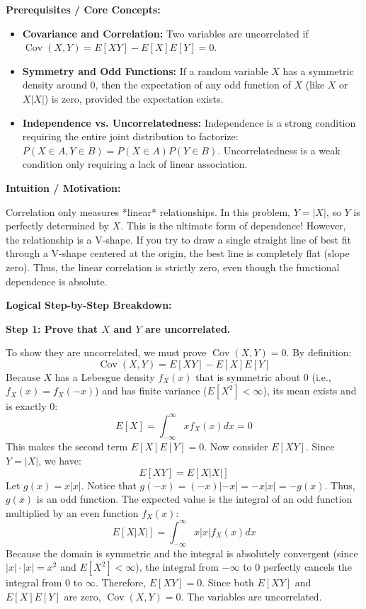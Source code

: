 \begin{solution}
\textbf{Prerequisites / Core Concepts:}
\begin{itemize}
    \item \textbf{Covariance and Correlation:} Two variables are uncorrelated if $\operatorname{Cov}(X,Y) = E[XY] - E[X]E[Y] = 0$.
    \item \textbf{Symmetry and Odd Functions:} If a random variable $X$ has a symmetric density around 0, then the expectation of any odd function of $X$ (like $X$ or $X|X|$) is zero, provided the expectation exists.
    \item \textbf{Independence vs. Uncorrelatedness:} Independence is a strong condition requiring the entire joint distribution to factorize: $P(X \in A, Y \in B) = P(X \in A)P(Y \in B)$. Uncorrelatedness is a weak condition only requiring a lack of linear association.
\end{itemize}

\textbf{Intuition / Motivation:}

Correlation only measures *linear* relationships. In this problem, $Y = |X|$, so $Y$ is perfectly determined by $X$. This is the ultimate form of dependence! However, the relationship is a V-shape. If you try to draw a single straight line of best fit through a V-shape centered at the origin, the best line is completely flat (slope zero). Thus, the linear correlation is strictly zero, even though the functional dependence is absolute.

\textbf{Logical Step-by-Step Breakdown:}

\textbf{Step 1: Prove that $X$ and $Y$ are uncorrelated.}

To show they are uncorrelated, we must prove $\operatorname{Cov}(X, Y) = 0$.
By definition:
\[ \operatorname{Cov}(X, Y) = E[XY] - E[X]E[Y] \]
Because $X$ has a Lebesgue density $f_X(x)$ that is symmetric about 0 (i.e., $f_X(x) = f_X(-x)$) and has finite variance ($E[X^2] < \infty$), its mean exists and is exactly 0:
\[ E[X] = \int_{-\infty}^\infty x f_X(x) dx = 0 \]
This makes the second term $E[X]E[Y] = 0$.
Now consider $E[XY]$. Since $Y = |X|$, we have:
\[ E[XY] = E[X|X|] \]
Let $g(x) = x|x|$. Notice that $g(-x) = (-x)|-x| = -x|x| = -g(x)$. Thus, $g(x)$ is an odd function.
The expected value is the integral of an odd function multiplied by an even function $f_X(x)$:
\[ E[X|X|] = \int_{-\infty}^\infty x|x| f_X(x) dx \]
Because the domain is symmetric and the integral is absolutely convergent (since $|x| \cdot |x| = x^2$ and $E[X^2] < \infty$), the integral from $-\infty$ to $0$ perfectly cancels the integral from $0$ to $\infty$.
Therefore, $E[XY] = 0$.
Since both $E[XY]$ and $E[X]E[Y]$ are zero, $\operatorname{Cov}(X, Y) = 0$. The variables are uncorrelated.


\end{solution}
